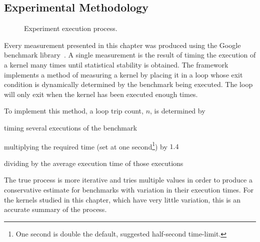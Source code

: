\documentclass[\main/thesis.tex]{subfiles}
\begin{document}
\subsection{Experimental Methodology}
\begin{figure}[t]
  \centering
  \caption{Experiment execution process.}
  \label{fig:execution}
\end{figure}

Every measurement presented in this chapter was produced using the Google\texttrademark{} benchmark library\footnotemark~\autocite{googlebench}.
A single measurement is the result of timing the execution of a kernel many times until statistical stability is obtained.
The framework implements a method of measuring a kernel by placing it in a loop whose exit condition is dynamically determined by the benchmark being executed.
The loop will only exit when the kernel has been executed enough times.

To implement this method, a loop trip count, $n$, is determined by
\begin{enumerate*}[itemjoin={{; }}, itemjoin*={{; and }}, label=(\arabic*), after={\footnotemark.}]
  \item timing several executions of the benchmark
  \item multiplying the required time (set at one second\footnote{One second is double the default, suggested half-second time-limit.}) by $1.4$
  \item dividing by the average execution time of those executions
\end{enumerate*}
The true process is more iterative and tries multiple values in order to produce a conservative estimate for benchmarks with variation in their execution times.
For the kernels studied in this chapter, which have very little variation, this is an accurate summary of the process.
\end{document}
